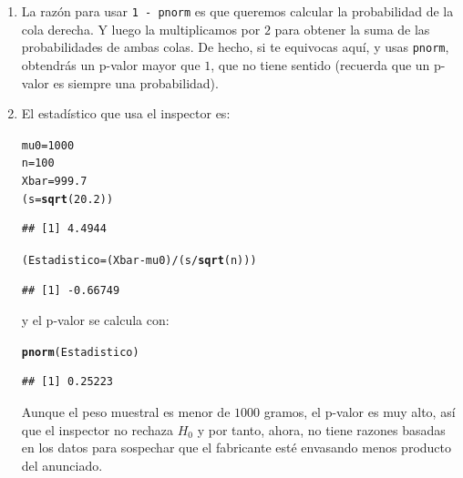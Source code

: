 \documentclass[10pt,a4paper]{article}\usepackage[]{graphicx}\usepackage[]{color}
\makeatletter
\newcommand{\hlnum}[1]{\textcolor[rgb]{0.686,0.059,0.569}{#1}}%
\newcommand{\hlopt}[1]{\textcolor[rgb]{0,0,0}{#1}}%
\newcommand{\hlstd}[1]{\textcolor[rgb]{0.345,0.345,0.345}{#1}}%
\newcommand{\hlkwb}[1]{\textcolor[rgb]{0.69,0.353,0.396}{#1}}%
\newcommand{\hlkwd}[1]{\textcolor[rgb]{0.737,0.353,0.396}{\textbf{#1}}}%
\newenvironment{kframe}{%
 \def\at@end@of@kframe{}%
 \ifinner\ifhmode%
  \def\at@end@of@kframe{\end{minipage}}%
  \begin{minipage}{\columnwidth}%
 \fi\fi%
 \def\FrameCommand##1{\hskip\@totalleftmargin \hskip-\fboxsep
 \colorbox{shadecolor}{##1}\hskip-\fboxsep
     \hskip-\linewidth \hskip-\@totalleftmargin \hskip\columnwidth}%
 \MakeFramed {\advance\hsize-\width
   \@totalleftmargin\z@ \linewidth\hsize
   \@setminipage}}%
 {\par\unskip\endMakeFramed%
 \at@end@of@kframe}
\newenvironment{knitrout}{}{} %
\makeatother
\begin{document}
\begin{enumerate}
  \item La razón para usar {\tt 1 - pnorm} es que queremos calcular la probabilidad de la cola derecha. Y luego la multiplicamos por $2$ para obtener la suma de las probabilidades de ambas colas. De hecho, si te equivocas aquí, y usas {\tt pnorm}, obtendrás un p-valor mayor que $1$, que no tiene sentido (recuerda que un p-valor es siempre una probabilidad).

  \item El estadístico que usa el inspector es:
\begin{knitrout}
\color{fgcolor}\begin{kframe}
\begin{alltt}
  \hlstd{mu0} \hlkwb{=} \hlnum{1000}
  \hlstd{n} \hlkwb{=} \hlnum{100}
  \hlstd{Xbar} \hlkwb{=} \hlnum{999.7}
  \hlstd{(s} \hlkwb{=} \hlkwd{sqrt}\hlstd{(}\hlnum{20.2}\hlstd{))}
\end{alltt}
\begin{verbatim}
## [1] 4.4944
\end{verbatim}
\begin{alltt}
  \hlstd{(Estadistico} \hlkwb{=} \hlstd{(Xbar} \hlopt{-} \hlstd{mu0)} \hlopt{/} \hlstd{(s} \hlopt{/} \hlkwd{sqrt}\hlstd{(n)))}
\end{alltt}
\begin{verbatim}
## [1] -0.66749
\end{verbatim}
\end{kframe}
\end{knitrout}
  y el p-valor se calcula con:
\begin{knitrout}
\color{fgcolor}\begin{kframe}
\begin{alltt}
\hlkwd{pnorm}\hlstd{(Estadistico)}
\end{alltt}
\begin{verbatim}
## [1] 0.25223
\end{verbatim}
\end{kframe}
\end{knitrout}
  Aunque el peso muestral es menor de $1000$ gramos, el p-valor es muy alto, así que el inspector no rechaza $H_0$ y por tanto, ahora, no tiene razones basadas en los datos para sospechar que el fabricante esté envasando menos producto del anunciado.


\end{enumerate}
\end{document}
